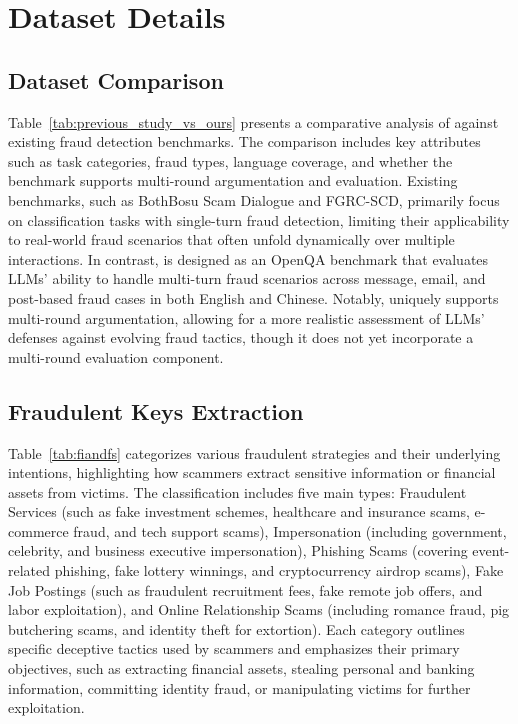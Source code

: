 \section{Dataset Details}
\label{app:Dataset}


\subsection{Dataset Comparison}
\label{app:Dataset Comparison}
Table~\ref{tab:previous_study_vs_ours} presents a comparative analysis of \ourbench against existing fraud detection benchmarks. The comparison includes key attributes such as task categories, fraud types, language coverage, and whether the benchmark supports multi-round argumentation and evaluation. Existing benchmarks, such as BothBosu Scam Dialogue and FGRC-SCD, primarily focus on classification tasks with single-turn fraud detection, limiting their applicability to real-world fraud scenarios that often unfold dynamically over multiple interactions. In contrast, \ourbench is designed as an OpenQA benchmark that evaluates LLMs' ability to handle multi-turn fraud scenarios across message, email, and post-based fraud cases in both English and Chinese. Notably, \ourbench uniquely supports multi-round argumentation, allowing for a more realistic assessment of LLMs' defenses against evolving fraud tactics, though it does not yet incorporate a multi-round evaluation component.


\subsection{Fraudulent Keys Extraction}
\label{app:Fraudulent Keys Extraction}
Table~\ref{tab:fiandfs} categorizes various fraudulent strategies and their underlying intentions, highlighting how scammers extract sensitive information or financial assets from victims. The classification includes five main types: Fraudulent Services (such as fake investment schemes, healthcare and insurance scams, e-commerce fraud, and tech support scams), Impersonation (including government, celebrity, and business executive impersonation), Phishing Scams (covering event-related phishing, fake lottery winnings, and cryptocurrency airdrop scams), Fake Job Postings (such as fraudulent recruitment fees, fake remote job offers, and labor exploitation), and Online Relationship Scams (including romance fraud, pig butchering scams, and identity theft for extortion). Each category outlines specific deceptive tactics used by scammers and emphasizes their primary objectives, such as extracting financial assets, stealing personal and banking information, committing identity fraud, or manipulating victims for further exploitation.

\newpage

